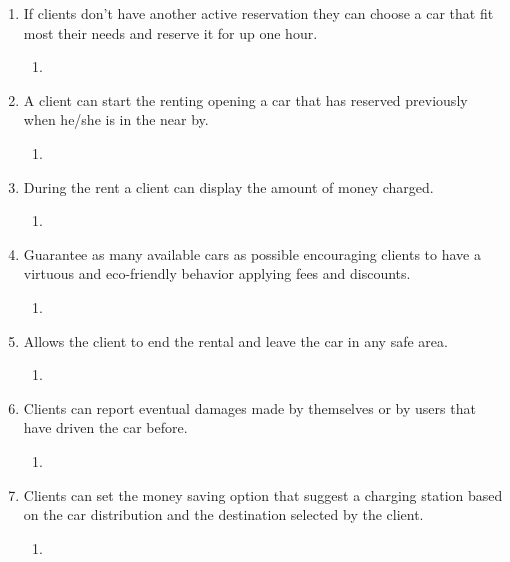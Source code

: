 \begin{enumerate}
\item If clients don’t have another active reservation they can choose a car that fit most their needs and reserve it for up one hour.
\begin{enumerate}
\item  
\end{enumerate}


\item A client can start the renting opening a car that has reserved previously when he/she is in the near by.
\begin{enumerate}
\item  
\end{enumerate}

\item During the rent a client can display the amount of money charged.
\begin{enumerate}
\item  
\end{enumerate}

\item Guarantee as many available cars as possible encouraging clients to have a virtuous and eco-friendly behavior applying fees and discounts.
\begin{enumerate}
\item  
\end{enumerate}

\item Allows the client to end the rental and leave the car in any safe area.
\begin{enumerate}
\item  
\end{enumerate}

\item Clients can report eventual damages made by themselves or by users that have driven the car before.
\begin{enumerate}
\item  
\end{enumerate}

\item Clients can set the money saving option that suggest a charging station based on the car distribution and the destination selected by the client.
\begin{enumerate}
\item  
\end{enumerate}

\end{enumerate}
